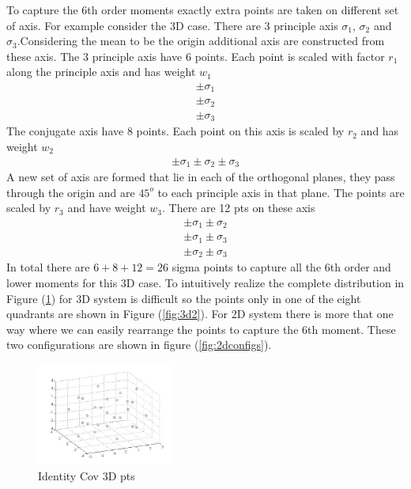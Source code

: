 \documentclass{article}
\begin{document}
To capture the 6th order moments exactly extra points are taken on different set of axis. For example consider the 3D case. There are 3 principle axis $\sigma_1$, $\sigma_2$ and $\sigma_3$.Considering the mean to be the origin additional axis are constructed from these axis. \newline\newline
The 3 principle axis have 6 points. Each point is scaled with factor $r_1$ along the principle axis and has weight $w_1$
 \begin{align}
 \pm \sigma_1\nonumber\\
 \pm\sigma_2\nonumber\\
 \pm\sigma_3
 \end{align}
The conjugate axis have 8 points. Each point on this axis is scaled by $r_2$ and has weight $w_2$ 
\begin{align}
\pm\sigma_1\pm\sigma_2\pm\sigma_3
\end{align}
A new set of axis  are formed that lie in each of the orthogonal planes, they pass through the origin and are $45^o$ to each principle axis in that plane. The points are scaled by $r_3$ and have weight $w_3$. There are 12 pts on these axis
\begin{align}
\pm\sigma_1\pm\sigma_2 \nonumber\\
\pm\sigma_1\pm\sigma_3 \nonumber\\
\pm\sigma_2\pm\sigma_3
\end{align}
 In total there are $6+8+12=26$ sigma points to capture all the 6th order and lower moments for this 3D case.
 To intuitively realize the complete distribution in Figure (\ref{fig:3d1}) for 3D system  is difficult so the points only in one of the eight quadrants are shown in Figure (\ref{fig:3d2}). For 2D system there is more that one way where we can easily rearrange the points to capture the 6th moment. These two configurations are shown in figure (\ref{fig:2dconfigs}).\newline
\begin{figure}[h]
	\centering
		\includegraphics[width=0.40\textwidth]{3d6thmomentpts.jpg}
	\caption{Identity Cov 3D pts}
	\label{fig:3d1}
\end{figure}
\end{document}
